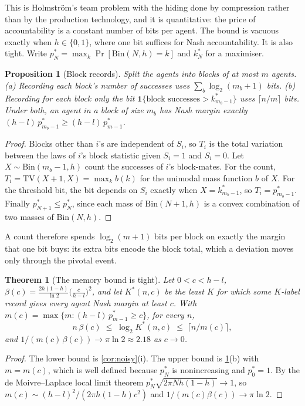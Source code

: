 \documentclass[sigconf,anonymous,acmthm=false]{acmart}
\theoremstyle{acmplain}
\newtheorem{theorem}{Theorem}
\newtheorem{proposition}{Proposition}
\theoremstyle{acmdefinition}
\newcommand{\TV}{\mathrm{TV}}
\begin{document}
This is Holmstr\"om's team problem with the hiding done by compression rather than by the
production technology, and it is quantitative: the price of accountability is a constant
number of bits per agent. The bound is vacuous exactly when $h\in\{0,1\}$, where one bit
suffices for Nash accountability. It is also tight. Write
$p^*_N=\max_k\Pr[\mathrm{Bin}(N,h)=k]$ and $k^*_N$ for a maximiser.

\begin{proposition}[Block records]\label{prop:blocks}
Split the agents into blocks of at most $m$ agents. (a) Recording each block's number of
successes uses $\sum_b\log_2(m_b+1)$ bits. (b) Recording for each block only the bit
$\mathbf1\{\text{block successes}>k^*_{m_b-1}\}$ uses $\lceil n/m\rceil$ bits. Under both, an
agent in a block of size $m_b$ has Nash margin exactly $(h-l)\,p^*_{m_b-1}\ge(h-l)\,p^*_{m-1}$.
\end{proposition}
\begin{proof}
Blocks other than $i$'s are independent of $S_i$, so $T_i$ is the total variation between the
laws of $i$'s block statistic given $S_i=1$ and $S_i=0$. Let $X\sim\mathrm{Bin}(m_b-1,h)$
count the successes of $i$'s block-mates. For the count, $T_i=\TV(X+1,X)=\max_kb(k)$ for the
unimodal mass function $b$ of $X$. For the threshold bit, the bit depends on $S_i$ exactly
when $X=k^*_{m_b-1}$, so $T_i=p^*_{m_b-1}$. Finally $p^*_{N+1}\le p^*_N$, since each mass of
$\mathrm{Bin}(N+1,h)$ is a convex combination of two masses of $\mathrm{Bin}(N,h)$.
\end{proof}

A count therefore spends $\log_2(m+1)$ bits per block on exactly the margin that one bit buys:
its extra bits encode the block total, which a deviation moves only through the pivotal event.

\begin{theorem}[The memory bound is tight]\label{thm:tight}
Let $0<c<h-l$, $\beta(c)=\frac{2h(1-h)}{\ln2}\big(\frac c{h-l}\big)^2$, and let $K^*(n,c)$ be
the least $K$ for which some $K$-label record gives every agent Nash margin at least $c$.
With $m(c)=\max\{m:(h-l)\,p^*_{m-1}\ge c\}$, for every $n$,
\[ n\,\beta(c)\;\le\;\log_2K^*(n,c)\;\le\;\lceil n/m(c)\rceil, \]
and $1/(m(c)\,\beta(c))\to\pi\ln2\approx2.18$ as $c\to0$.
\end{theorem}
\begin{proof}
The lower bound is \cref{cor:noisy}(i). The upper bound is \cref{prop:blocks}(b) with
$m=m(c)$, which is well defined because $p^*_N$ is nonincreasing and $p^*_0=1$. By the de
Moivre--Laplace local limit theorem $p^*_N\sqrt{2\pi Nh(1-h)}\to1$, so
$m(c)\sim(h-l)^2/(2\pi h(1-h)c^2)$ and $1/(m(c)\beta(c))\to\pi\ln2$.
\end{proof}
\end{document}
